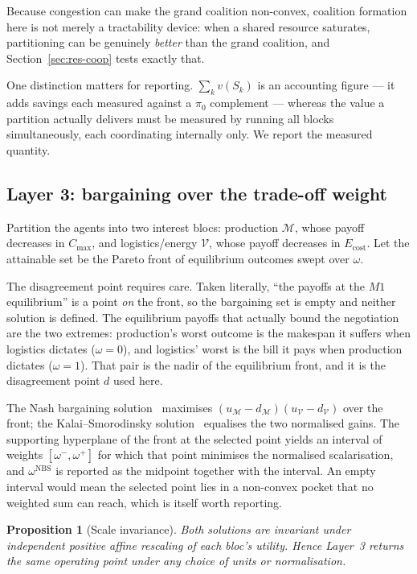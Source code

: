 \documentclass[preprint, 3p, review, 12pt]{elsarticle}
\newtheorem{proposition}[theorem]{Proposition}
\theoremstyle{definition}
\begin{document}
Because congestion can make the grand coalition non-convex, coalition formation here is not
merely a tractability device: when a shared resource saturates, partitioning can be genuinely
\emph{better} than the grand coalition, and Section~\ref{sec:res-coop} tests exactly that.

One distinction matters for reporting. $\sum_k v(S_k)$ is an accounting figure --- it adds
savings each measured against a $\pi_0$ complement --- whereas the value a partition actually
delivers must be measured by running all blocks simultaneously, each coordinating internally
only. We report the measured quantity.

\subsection{Layer 3: bargaining over the trade-off weight}
\label{sec:layer3}

Partition the agents into two interest blocs: production $\mathcal{M}$, whose payoff decreases
in $C_{\max}$, and logistics/energy $\mathcal{V}$, whose payoff decreases in
$E_{\mathrm{cost}}$. Let the attainable set be the Pareto front of equilibrium outcomes swept
over $\omega$.

The disagreement point requires care. Taken literally, ``the payoffs at the $M1$ equilibrium''
is a point \emph{on} the front, so the bargaining set is empty and neither solution is
defined. The equilibrium payoffs that actually bound the negotiation are the two extremes:
production's worst outcome is the makespan it suffers when logistics dictates
($\omega=0$), and logistics' worst is the bill it pays when production dictates
($\omega=1$). That pair is the nadir of the equilibrium front, and it is the disagreement
point $d$ used here.

The Nash bargaining solution~\citep{nash1950bargaining} maximises
$(u_{\mathcal{M}}-d_{\mathcal{M}})(u_{\mathcal{V}}-d_{\mathcal{V}})$ over the front; the
Kalai--Smorodinsky solution~\citep{kalai1975other} equalises the two normalised gains. The
supporting hyperplane of the front at the selected point yields an interval of weights
$[\omega^{-},\omega^{+}]$ for which that point minimises the normalised scalarisation, and
$\omega^{\mathrm{NBS}}$ is reported as the midpoint together with the interval. An empty
interval would mean the selected point lies in a non-convex pocket that no weighted sum can
reach, which is itself worth reporting.

\begin{proposition}[Scale invariance]
\label{prop:scale}
Both solutions are invariant under independent positive affine rescaling of each bloc's
utility. Hence Layer~3 returns the same operating point under any choice of units or
normalisation.
\end{proposition}
\end{document}
